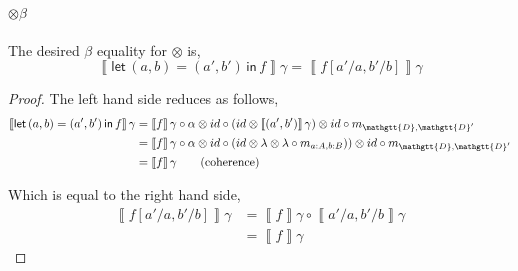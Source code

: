 \documentclass[acmsmall,nonacm]{acmart}
\renewcommand{\Delta}{\mathgtt{D}}
\newcommand{\sem}[1]{\left\llbracket{#1}\right\rrbracket}
\newcommand{\semg}[1]{\sem{#1}\gamma}
\newcommand{\letin}[3]{\mathsf{let}\, #1 = #2 \, \mathsf{in}\, #3}
\begin{document}
\begin{center}
\end{center}

\paragraph{$\otimes\beta$}
The desired $\beta$ equality for $\otimes$ is,
\[
  \semg{\letin {(a,b)} {(a',b')} {f}} = \semg{f[a'/a,b'/b]}
\]
\begin{proof}
The left hand side reduces as follows,
\begin{align*}
  \semg{\letin {(a,b)} {(a',b')} {f}}
  & = \semg{f} \circ \alpha \otimes id \circ (id \otimes \semg{(a' , b')}) \otimes id \circ m_{\Delta,\Delta'} \\
  & = \semg{f} \circ \alpha \otimes id \circ (id \otimes \lambda \otimes \lambda \circ m_{a : A, b : B})) \otimes id \circ m_{\Delta,\Delta'} \\
  & = \semg{f} \tag{coherence}
\end{align*}

Which is equal to the right hand side,
\begin{align*}
  \semg{f[a'/a,b'/b]}
  & = \semg{f} \circ \semg{a'/a,b'/b} \\
  & = \semg{f} \tag{coherence}
\end{align*}
\end{proof}
\end{document}
